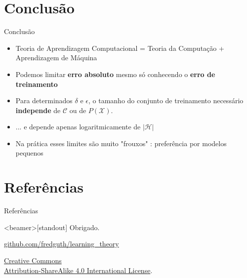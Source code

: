 \documentclass[10pt, professionalfonts]{beamer}
\begin{document}
{

  \AtBeginSection{}
\section{Conclusão}
\begin{frame}{Conclusão}
  \begin{itemize}[<+->]
    \item Teoria de Aprendizagem Computacional = Teoria da Computação + Aprendizagem de Máquina
    \item Podemos limitar \textbf{erro absoluto} mesmo só conhecendo o \textbf{erro de treinamento}
    \item Para determinados $\delta$ e $\epsilon$, o tamanho do conjunto de treinamento necessário \textbf{independe} de $\mathcal{C}$ ou  de $P(\mathcal{X})$.
    \item ... e depende apenas logaritmicamente de $|\mathcal{H}|$
    \item Na prática esses limites são muito "frouxos" \cite{MitchelPAC}: preferência por modelos pequenos
    \end{itemize}
\end{frame}
}
{

  \AtBeginSection{}
\section{Referências}
\begin{frame}[allowframebreaks]{Referências}

  
  

\end{frame}
}
\begin{frame}<beamer>[standout]
  Obrigado.
  \vspace*{.5cm}
\begin{center}\href{https://github.com/fredguth/learning_theory}{\url{github.com/fredguth/learning_theory}}\end{center}
  \vspace*{.5cm}
  \small{
    \begin{center}\ccbysa\end{center}
    \href{http://creativecommons.org/licenses/by-sa/4.0/}{Creative Commons \\
      Attribution-ShareAlike 4.0 International License}.
  }
\end{frame}




\end{document}
